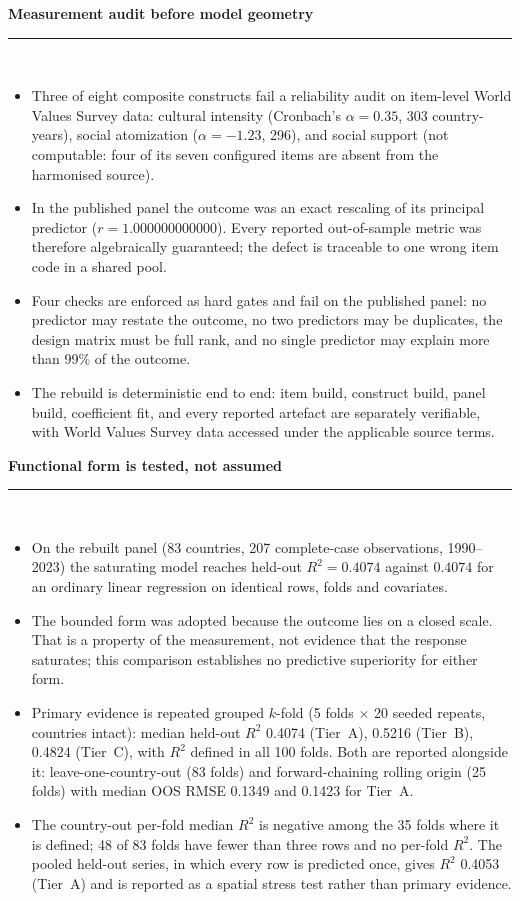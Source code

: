 \documentclass[11pt]{article}
\newcommand{\SubRule}{\color{black}\rule{\linewidth}{0.4pt}}
\newcommand{\Section}[1]{\needspace{5\baselineskip}\vspace{0.85em}\noindent\textbf{#1}\\[-0.25em]\SubRule\\[0.45em]}
\begin{document}
\Section{Measurement audit before model geometry}
\begin{itemize}
    \setlength{\itemsep}{0.40em}
    \item Three of eight composite constructs fail a reliability audit on item-level World Values Survey data: cultural intensity (Cronbach's $\alpha=0.35$, 303 country-years), social atomization ($\alpha=-1.23$, 296), and social support (not computable: four of its seven configured items are absent from the harmonised source).
    \item In the published panel the outcome was an exact rescaling of its principal predictor ($r=1.000000000000$). Every reported out-of-sample metric was therefore algebraically guaranteed; the defect is traceable to one wrong item code in a shared pool.
    \item Four checks are enforced as hard gates and fail on the published panel: no predictor may restate the outcome, no two predictors may be duplicates, the design matrix must be full rank, and no single predictor may explain more than 99\% of the outcome.
    \item The rebuild is deterministic end to end: item build, construct build, panel build, coefficient fit, and every reported artefact are separately verifiable, with World Values Survey data accessed under the applicable source terms.
\end{itemize}

\Section{Functional form is tested, not assumed}
\begin{itemize}
    \setlength{\itemsep}{0.40em}
    \item On the rebuilt panel (83 countries, 207 complete-case observations, 1990--2023) the saturating model reaches held-out $R^2=0.4074$ against $0.4074$ for an ordinary linear regression on identical rows, folds and covariates.
    \item The bounded form was adopted because the outcome lies on a closed scale. That is a property of the measurement, not evidence that the response saturates; this comparison establishes no predictive superiority for either form.
    \item Primary evidence is repeated grouped $k$-fold (5 folds $\times$ 20 seeded repeats, countries intact): median held-out $R^2$ 0.4074 (Tier~A), 0.5216 (Tier~B), 0.4824 (Tier~C), with $R^2$ defined in all 100 folds. Both are reported alongside it: leave-one-country-out (83 folds) and forward-chaining rolling origin (25 folds) with median OOS RMSE 0.1349 and 0.1423 for Tier~A.
    \item The country-out per-fold median $R^2$ is negative among the 35 folds where it is defined; 48 of 83 folds have fewer than three rows and no per-fold $R^2$. The pooled held-out series, in which every row is predicted once, gives $R^2$ 0.4053 (Tier~A) and is reported as a spatial stress test rather than primary evidence.
\end{itemize}
\end{document}
